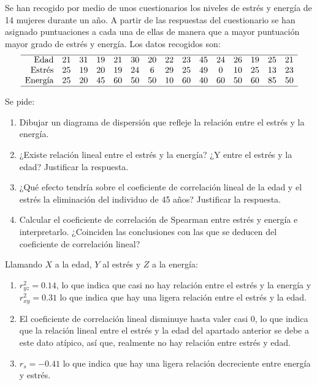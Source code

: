 {Se han recogido por medio de unos cuestionarios los niveles de estrés y energía de 14 mujeres durante un año. A partir
de las respuestas del cuestionario se han asignado puntuaciones a cada una de ellas de manera que a mayor puntuación
mayor grado de estrés y energía. Los datos recogidos son:
\[
\begin{array}{rcccccccccccccc}
\hline
\mbox{Edad}   & 21 & 31 & 19 & 21 & 30 & 20 & 22 & 23 & 45 & 24 & 26 & 19 & 25 & 21\\
\mbox{Estrés} & 25 & 19 & 20 & 19 & 24 &  6 & 29 & 25 & 49 &  0 & 10 & 25 & 13 & 23\\
\mbox{Energía}& 25 & 20 & 45 & 60 & 50 & 50 & 10 & 60 & 40 & 60 & 50 & 60 & 85 & 50\\
\hline
\end{array}
\]

Se pide:
\begin{enumerate}
\item Dibujar un diagrama de dispersión que refleje la relación entre el estrés y la energía.
\item ¿Existe relación lineal entre el estrés y la energía?
¿Y entre el estrés y la edad?
Justificar la respuesta.
\item ¿Qué efecto tendría sobre el coeficiente de correlación lineal de la edad y el estrés la eliminación del individuo
de 45 años? Justificar la respuesta.
\item Calcular el coeficiente de correlación de Spearman entre estrés y energía e interpretarlo.
¿Coinciden las conclusiones con las que se deducen del coeficiente de correlación lineal? 
\end{enumerate}
}
{Llamando $X$ a la edad, $Y$ al estrés y $Z$ a la energía:
\begin{enumerate}[start=2]
\item $r^2_{yz}=0.14$, lo que indica que casi no hay relación entre el estrés y la energía y $r^2_{xy}=0.31$ lo que
indica que hay una ligera relación entre el estrés y la edad.
\item El coeficiente de correlación lineal disminuye hasta valer casi 0, lo que indica que la relación lineal entre el
estrés y la edad del apartado anterior se debe a este dato atípico, así que, realmente no hay relación entre estrés y
edad.
\item $r_s=-0.41$ lo que indica que hay una ligera relación decreciente entre energía y estrés. 
\end{enumerate}
}
{}

